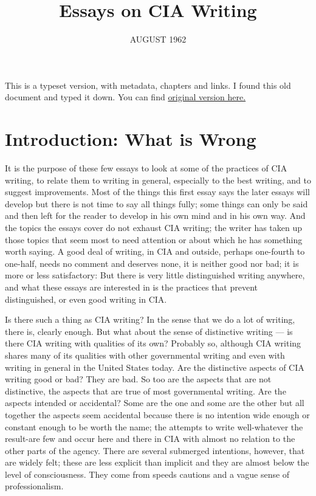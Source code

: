 \documentclass[
    oneside,
    11pt,
]{memoir}
\title{Essays on CIA Writing}
\author{}
\date{AUGUST 1962}
\begin{document}
\frontmatter

\maketitle

\newpage

This is a typeset version, with metadata, chapters and links. I found this old document and typed it down. You can find \href{https://www.cia.gov/readingroom/document/cia-rdp78-00915r001400200001-3}{original version here.}

\mainmatter{}
\tableofcontents*
\thispagestyle{empty}

\newpage

\chapter{Introduction: What is Wrong}
It is the purpose of these few essays to look at some of the practices of CIA writing, to relate them to writing in general, especially to the best writing, and to suggest improvements. Most of the things this first essay says the later essays will develop but there is not time to say all things fully; some things can only be said and then left for the reader to develop in his own mind and in his own way. And the topics the essays cover do not exhaust CIA writing; the writer has taken up those topics that seem most to need attention or about which he has something worth saying. A good deal of writing, in CIA and outside, perhaps one-fourth to one-half, needs no comment and deserves none, it is neither good nor bad; it is more or less satisfactory: But there is very little distinguished writing anywhere, and what these essays are interested in is the practices that prevent distinguished, or even good writing in CIA.

Is there such a thing as CIA writing? In the sense that we do a lot of writing, there is, clearly enough. But what about the sense of distinctive writing --- is there CIA writing with qualities of its own? Probably so, although CIA writing shares many of its qualities with other governmental writing and even with writing in general in the United States today. Are the distinctive aspects of CIA writing good or bad? They are bad. So too are the aspects that are not distinctive, the aspects that are true of most governmental writing. Are the aspects intended or accidental? Some are the one and some are the other but all together the aspects seem accidental because there is no intention wide enough or constant enough to be worth the name; the attempts to write well-whatever the result-are few and occur here and there in CIA with almost no relation to the other parts of the agency. There are several submerged intentions, however, that are widely felt; these are less explicit than implicit and they are almost below the level of consciousness. They come from speeds cautions and a vague sense of professionalism.
\end{document}
